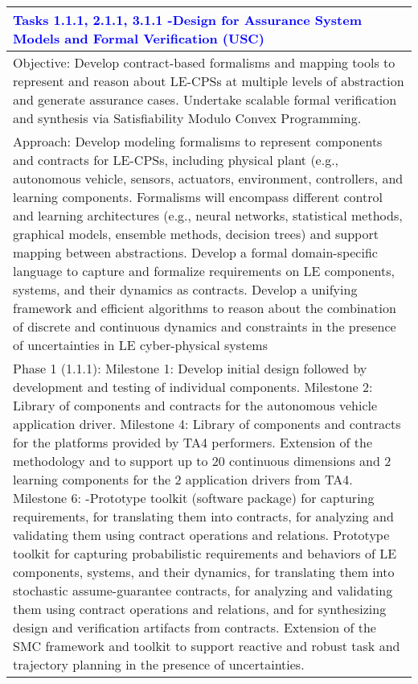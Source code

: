 {\scriptsize

\begin{longtable} {|p{\textwidth} | }

\hline

\textcolor{blue} {\footnotesize {\textbf{Tasks 1.1.1, 2.1.1, 3.1.1 -Design for Assurance System Models and Formal Verification (USC)}}} \\ \hline
Objective:  Develop contract-based formalisms and mapping tools to represent and reason about LE-CPSs at multiple levels of abstraction and generate assurance cases.  Undertake scalable formal verification and synthesis via Satisfiability Modulo Convex Programming. \\ \hline
Approach:  Develop modeling formalisms to represent components and contracts for LE-CPSs, including physical plant (e.g., autonomous vehicle, sensors, actuators, environment, controllers, and learning components. Formalisms will encompass different control and learning architectures (e.g., neural networks, statistical methods, graphical models, ensemble methods, decision trees) and support mapping between abstractions.   Develop a formal domain-specific language to capture and formalize requirements on LE components, systems, and their dynamics as contracts.   Develop a unifying framework and efficient algorithms to reason about the combination of discrete and continuous dynamics and constraints in the presence of uncertainties in LE cyber-physical systems \\ \hline
Phase 1 (1.1.1):  Milestone 1: Develop initial design followed by development and testing of individual components.  Milestone 2:  Library of components and contracts for the autonomous vehicle application driver.  Milestone 4: Library of components and contracts for the platforms provided by TA4 performers. Extension of the methodology and to support up to 20 continuous dimensions and 2 learning components for the 2 application drivers from TA4.  Milestone 6: -Prototype toolkit (software package) for capturing requirements, for translating them into contracts, for analyzing and validating them using contract operations and relations.  Prototype toolkit for capturing probabilistic requirements and behaviors of LE components, systems, and their dynamics, for translating them into stochastic assume-guarantee contracts, for analyzing and validating them using contract operations and relations, and for synthesizing design and verification artifacts from contracts.  Extension of the SMC framework and toolkit to support reactive and robust task and trajectory planning in the presence of uncertainties. \\ \hline

\end{longtable}}
